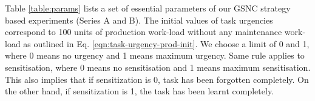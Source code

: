\documentclass[journal]{IEEEtran}
\begin{document}
Table \ref{table:params} lists a set of essential parameters of our GSNC strategy based experiments (Series A and B). %
The initial values of task urgencies correspond to 100 units of production work-load without any maintenance work-load as outlined in Eq. \ref{eqn:task-urgency-prod-init}. We choose a limit of 0 and 1, where 0 means no urgency and 1 means maximum urgency. Same rule applies to sensitisation, where 0 means no sensitisation and 1 means maximum sensitisation. This also implies that if sensitization is 0, task has been forgotten completely. On the other hand, if sensitization is 1, the task has been learnt completely.  %
%
\end{document}
